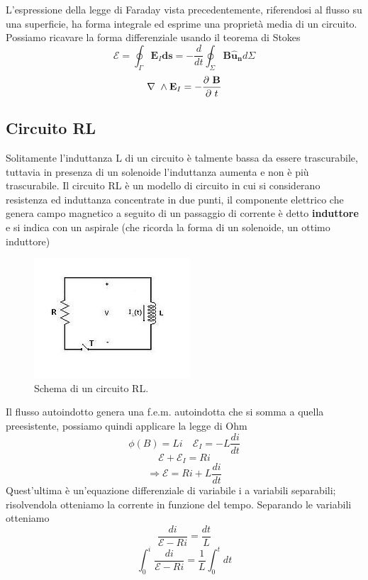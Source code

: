 \documentclass[
10pt, %
a4paper, %
oneside, %
headinclude,footinclude, %
BCOR5mm, %
]{scrartcl}
\begin{document}
L'espressione della legge di Faraday vista precedentemente, riferendosi al flusso su una superficie, ha forma integrale ed esprime una proprietà media di un circuito. Possiamo ricavare la forma differenziale usando il teorema di Stokes
\[\mathcal{E} = \oint_{\Gamma}\mathbf{E}_I \mathbf{ds} = -\frac{d}{dt}\oint_{\Sigma}\mathbf{B\mathbf{\hat{u}_n}}d\Sigma\]
\begin{align}\label{eq:Faraday_differenziale}
	\nabla\ \wedge\mathbf{E}_I = -\frac{\partial\  \mathbf{B}}{\partial\  t}
\end{align}
\subsection{Circuito RL}
Solitamente l'induttanza L di un circuito è talmente bassa da essere trascurabile, tuttavia in presenza di un solenoide l'induttanza aumenta e non è più trascurabile. Il circuito RL è un modello di circuito in cui si considerano resistenza ed induttanza concentrate in due punti, il componente elettrico che genera campo magnetico a seguito di un passaggio di corrente è detto \textbf{induttore} e si indica con un aspirale (che ricorda la forma di un solenoide, un ottimo induttore)
\begin{figure}[h!]
	\centering
	\includegraphics[width=0.6\linewidth]{images/circuito_RL}
	\caption{Schema di un circuito RL.}
	\label{fig:circuitorl}
\end{figure}
\FloatBarrier
Il flusso autoindotto genera una f.e.m. autoindotta che si somma a quella preesistente, possiamo quindi applicare la legge di Ohm 
\[\phi(B) = L i \quad \mathcal{E}_I = -L\frac{d i}{dt}\]
\[\mathcal{E} + \mathcal{E}_I = Ri \]
\[\Rightarrow \mathcal{E} = Ri+L\frac{di}{dt}\]
Quest'ultima è un'equazione differenziale di variabile i a variabili separabili; risolvendola otteniamo la corrente in funzione del tempo. Separando le variabili otteniamo
\[\frac{di}{\mathcal{E}-Ri} = \frac{dt}{L}\]
\[\int_{0}^{i}\frac{di}{\mathcal{E}-Ri} = \frac{1}{L}\int_{0}^{t}dt\]
\end{document}
